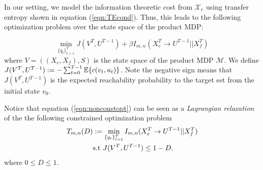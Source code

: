 




In our setting, we model the information theoretic cost from $\mathcal{X}_e$ using transfer entropy shown in equation (\ref{eqn:TEcond}). Thus, this leads to the following optimization problem over the state space of the product MDP:

\begin{equation}\label{eqn:nonconstopt}
\min_{\{q_t\}_{t=1}^T} J(V^{T},U^{T-1}) + \beta I_{m,n}(X_e^T \rightarrow U^{T-1}||X_f^T)
\end{equation}
where $V = ((X_e,X_f),S)$ is the state space of the product MDP $\mathcal{M}$. We define $J(V^T,U^{T-1}) := - \sum_{t=0}^{T-1}{\mathbb{E}\{c(v_t,u_t)\}}$. Note the negative sign means that $J(V^T,U^{T-1})$ is the expected reachability probability to the target set from the initial state $v_0$.

Notice that equation (\ref{eqn:nonconstopt}) can be seen as a \emph{Lagrangian relaxation} of the the following constrained optimization problem
\begin{align}\label{eqn:constopt}
T_{m,n}(D) & := \min_{\{q_t\}_{t=1}^T} I_{m,n}(X_e^T \rightarrow U^{T-1}||X_f^T) \\
& \textrm{s.t } J(V^{T},U^{T-1}) \leq 1 - D. \nonumber
\end{align}
where $0\leq D \leq 1$.

